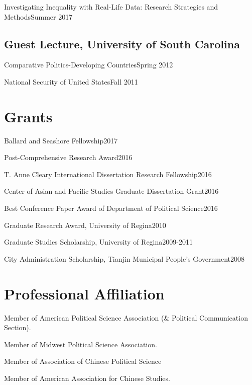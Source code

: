 \documentclass[10.5pt,]{article}
\providecommand{\tightlist}{%
	\setlength{\itemsep}{0pt}\setlength{\parskip}{0pt}}
\renewenvironment{itemize}{
	\begin{list}{}{
			\setlength{\leftmargin}{1.5em}
		}
	}{
	\end{list}
}
\begin{document}
\begin{itemize}
\tightlist
\item
  Investigating Inequality with Real-Life Data: Research Strategies and
  Methods\hfill Summer 2017
\end{itemize}

\subsection{Guest Lecture, University of South
Carolina}\label{guest-lecture-university-of-south-carolina}

\begin{itemize}
\tightlist
\item
  Comparative Politics-Developing Countries\hfill Spring 2012
\item
  National Security of United States\hfill Fall 2011
\end{itemize}

\section{Grants}\label{grants}

\begin{itemize}
\tightlist
\item
  Ballard and Seashore Fellowship\hfill 2017
\item
  Post-Comprehensive Research Award\hfill 2016
\item
  T. Anne Cleary International Dissertation Research
  Fellowship\hfill 2016
\item
  Center of Asian and Pacific Studies Graduate Dissertation
  Grant\hfill 2016
\item
  Best Conference Paper Award of Department of Political
  Science\hfill 2016
\item
  Graduate Research Award, University of Regina\hfill 2010
\item
  Graduate Studies Scholarship, University of Regina\hfill 2009-2011
\item
  City Administration Scholarship, Tianjin Municipal People's
  Government\hfill 2008
\end{itemize}

\section{Professional Affiliation}\label{professional-affiliation}

\begin{itemize}
\tightlist
\item
  Member of American Political Science Association (\& Political
  Communication Section).
\item
  Member of Midwest Political Science Association.
\item
  Member of Association of Chinese Political Science
\item
  Member of American Association for Chinese Studies.
\end{itemize}
\end{document}
